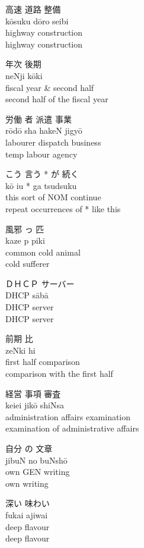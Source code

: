 \glll 高速 道路 整備 \\
k\={o}suku d\={o}ro seibi \\
highway {} construction \\
\gt highway construction

\glll 年次 後期 \\
neNji k\={o}ki \\
{fiscal year} & {second half} \\
\gt second half of the fiscal year

\glll 労働 者 派遣 事業 \\
r\={o}d\={o} sha hakeN jigy\={o} \\
labourer {} dispatch business \\
\gt temp labour agency

\glll こう 言う * が 続く \\
k\={o} iu * ga tsudsuku \\
{this sort of} {} NOM continue \\
\gt repeat occurrences of * like this


\glll 風邪 っ 匹 \\
kaze p piki \\
{common cold} {} {animal} \\
\gt cold sufferer 

\glll ＤＨＣＰ サーバー \\
DHCP s\={a}b\={a} \\
DHCP server \\
\gt DHCP server

\glll 前期 比 \\
zeNki hi \\
{first half} comparison \\
\gt comparison with the first half

\glll 経営 事項 審査 \\
keiei jik\={o} shiNsa \\
administration affairs examination \\
\gt examination of administrative affairs

\glll 自分 の 文章 \\
jibuN no buNsh\={o} \\
own GEN writing \\
\gt own writing

\glll 深い 味わい \\
fukai ajiwai \\
deep flavour \\
\gt deep flavour
